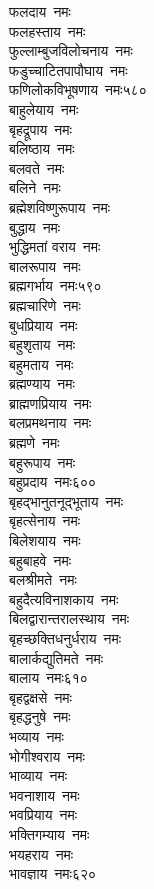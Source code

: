 \begin{multicols}{\maxColumns}
\begin{flushleft}
फलदाय~नमः\\
फलहस्ताय~नमः\\
फुल्लाम्बुजविलोचनाय~नमः\\
फडुच्चाटितपापौघाय~नमः\\
फणिलोकविभूषणाय~नमः\hfill ५८०\\
बाहुलेयाय~नमः\\
बृहद्रूपाय~नमः\\
बलिष्ठाय~नमः\\
बलवते~नमः\\
बलिने~नमः\\
ब्रह्मेशविष्णुरूपाय~नमः\\
बुद्धाय~नमः\\
भुद्धिमतां वराय~नमः\\
बालरूपाय~नमः\\
ब्रह्मगर्भाय~नमः\hfill ५९०\\
ब्रह्मचारिणे~नमः\\
बुधप्रियाय~नमः\\
बहुश‍ृताय~नमः\\
बहुमताय~नमः\\
ब्रह्मण्याय~नमः\\
ब्राह्मणप्रियाय~नमः\\
बलप्रमथनाय~नमः\\
ब्रह्मणे~नमः\\
बहुरूपाय~नमः\\
बहुप्रदाय~नमः\hfill ६००\\
बृहद्भानुतनूद्भूताय~नमः\\
बृहत्सेनाय~नमः\\
बिलेशयाय~नमः\\
बहुबाहवे~नमः\\
बलश्रीमते~नमः\\
बहुदैत्यविनाशकाय~नमः\\
बिलद्वारान्तरालस्थाय~नमः\\
बृहच्छक्तिधनुर्धराय~नमः\\
बालार्कद्युतिमते~नमः\\
बालाय~नमः\hfill ६१०\\
बृहद्वक्षसे~नमः\\
बृहद्धनुषे~नमः\\
भव्याय~नमः\\
भोगीश्वराय~नमः\\
भाव्याय~नमः\\
भवनाशाय~नमः\\
भवप्रियाय~नमः\\
भक्तिगम्याय~नमः\\
भयहराय~नमः\\
भावज्ञाय~नमः\hfill ६२०\\

\end{flushleft}
\end{multicols}
